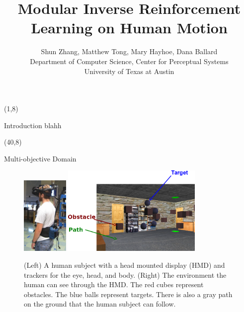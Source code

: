 \documentclass[final]{beamer}
\title{Modular Inverse Reinforcement Learning on Human Motion}
\author{Shun Zhang, Matthew Tong, Mary Hayhoe, Dana Ballard\\
Department of Computer Science, Center for Perceptual Systems\\
University of Texas at Austin}
\begin{document}
\begin{frame}{} 

\begin{textblock}{37}(1,8)
\begin{block}{Introduction}
blahh
\end{block}
\end{textblock}

\begin{textblock}{37}(40,8)
\begin{block}{Multi-objective Domain}
\begin{figure}[h]
\centering
\includegraphics[width=0.2\textwidth]{human.jpg}
\includegraphics[width=0.6\textwidth]{env.png}
\caption{(Left) A human subject with a head mounted display (HMD) and trackers
for the eye, head, and body.  (Right) The environment the human can see through
the HMD.  The red cubes represent obstacles. The blue balls represent targets.
There is also a gray path on the ground that the human subject can follow.}
\label{fig:avatar}
\end{figure}
\end{block}


\end{textblock}
\end{frame}
\end{document}
